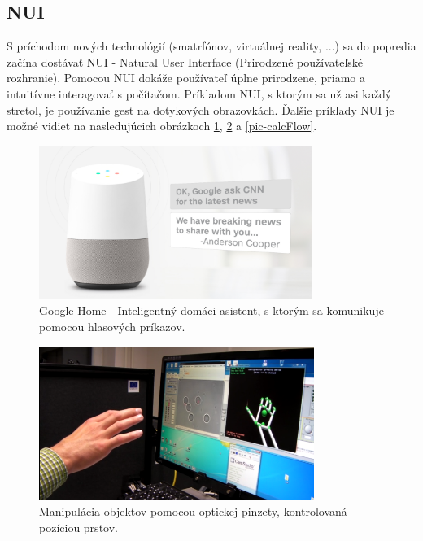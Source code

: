\subsection{NUI}
S príchodom nových technológií (smatrfónov, virtuálnej reality, ...) sa do popredia začína dostávať NUI - Natural User Interface (Prirodzené používateľské rozhranie).
Pomocou NUI dokáže používateľ úplne prirodzene, priamo a intuitívne interagovať s počítačom.
Príkladom NUI, s ktorým sa už asi každý stretol, je používanie gest na dotykových obrazovkách.
Ďalšie príklady NUI je možné vidiet na nasledujúcich obrázkoch \ref{pic-GoogleHome}, \ref{pic-Microrobotics} a \ref{pic-calcFlow}.

\begin{figure}[H]
	\begin{center}
		\includegraphics[height=5cm]{pics/googleHome.jpg}
		\caption{Google Home - Inteligentný domáci asistent, s ktorým sa komunikuje pomocou hlasových príkazov.
		 \cite{GoogleHome}}
		\label{pic-GoogleHome}
	\end{center}
\end{figure}

\begin{figure}[H]
	\begin{center}
		\includegraphics[height=5cm]{pics/Microrobotics.png}
			\caption{Manipulácia objektov pomocou optickej pinzety, kontrolovaná pozíciou prstov.
			\cite{Microrobotics}}
		\label{pic-Microrobotics}
	\end{center}
\end{figure}

